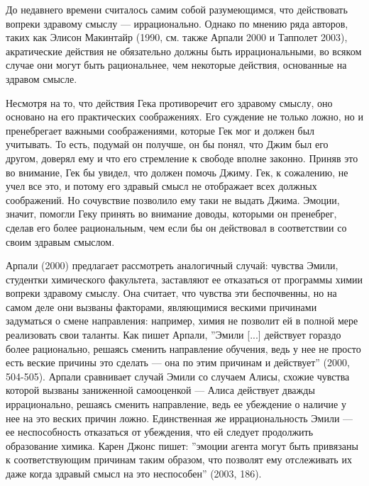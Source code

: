 \documentclass[11pt]{book}
\begin{document}
До недавнего времени считалось самим собой разумеющимся, что действовать вопреки здравому смыслу --- иррационально. Однако по мнению ряда авторов, таких как Элисон Макинтайр (1990, см. также Арпали 2000 и Тапполет 2003), акратические действия не обязательно должны быть иррациональными, во всяком случае они могут быть рациональнее, чем некоторые действия, основанные на здравом смысле.

Несмотря на то, что действия Гека противоречит его здравому смыслу, оно основано на его практических соображениях. Его суждение не только ложно, но и пренебрегает важными соображениями, которые Гек мог и должен был учитывать. То есть, подумай он получше, он бы понял, что Джим был его другом, доверял ему и что его стремление к свободе вполне законно. Приняв это во внимание, Гек бы увидел, что должен помочь Джиму. Гек, к сожалению, не учел все это, и потому его здравый смысл не отображает всех должных соображений. Но сочувствие позволило ему таки не выдать Джима. Эмоции, значит, помогли Геку принять во внимание доводы, которыми он пренебрег, сделав его более рациональным, чем если бы он действовал в соответствии со своим здравым смыслом.

Арпали (2000) предлагает рассмотреть аналогичный случай: чувства Эмили, студентки химического факультета, заставляют ее отказаться от программы химии вопреки здравому смыслу. Она считает, что чувства эти беспочвенны, но на самом деле они вызваны факторами, являющимися вескими причинами задуматься о смене направления: например, химия не позволит ей в полной мере реализовать свои таланты. Как пишет Арпали, ''Эмили [...] действует гораздо более рационально, решаясь сменить направление обучения, ведь у нее не просто есть веские причины это сделать --- она по этим причинам и действует'' (2000, 504-505). Арпали сравнивает случай Эмили со случаем Алисы, схожие чувства которой вызваны заниженной самооценкой --- Алиса действует дважды иррационально, решаясь сменить направление, ведь ее убеждение о наличие у нее на это веских причин ложно. Единственная же иррациональность Эмили --- ее неспособность отказаться от убеждения, что ей следует продолжить образование химика. Карен Джонс пишет: ''эмоции агента могут быть привязаны к соответствующим причинам таким образом, что позволят ему отслеживать их даже когда здравый смысл на это неспособен'' (2003, 186).
\end{document}
